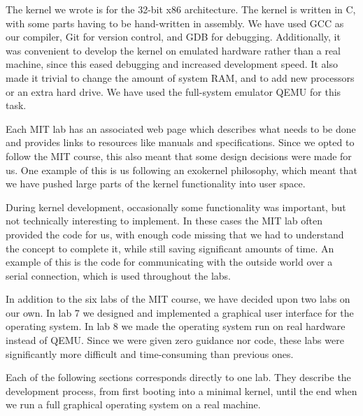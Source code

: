 \documentclass{report}
\begin{document}
The kernel we wrote is for the 32-bit x86 architecture. The kernel is written
in C, with some parts having to be hand-written in assembly. We have used GCC
as our compiler, Git for version control, and GDB for debugging. Additionally,
it was convenient to develop the kernel on emulated hardware rather than a
real machine, since this eased debugging and increased development speed. It
also made it trivial to change the amount of system RAM, and to add new
processors or an extra hard drive. We have used the full-system emulator QEMU
for this task.

Each MIT lab has an associated web page which describes what needs to be done
and provides links to resources like manuals and specifications. Since we opted
to follow the MIT course, this also meant that some design decisions were made
for us. One example of this is us following an exokernel philosophy, which
meant that we have pushed large parts of the kernel functionality into user
space.

During kernel development, occasionally some functionality was important,
but not technically interesting to implement. In these cases the MIT lab often
provided the code for us, with enough code missing that we had to understand
the concept to complete it, while still saving significant amounts of time. An
example of this is the code for communicating with the outside world over a
serial connection, which is used throughout the labs.


In addition to the six labs of the MIT course, we have decided upon two labs
on our own. In lab 7 we designed and implemented a graphical user interface
for the operating system. In lab 8 we made the operating system run on real
hardware instead of QEMU. Since we were given zero guidance nor code, these
labs were significantly more difficult and time-consuming than previous ones.

Each of the following sections corresponds directly to one lab. They describe
the development process, from first booting into a minimal kernel, until the end
when we run a full graphical operating system on a real machine.





\end{document}

